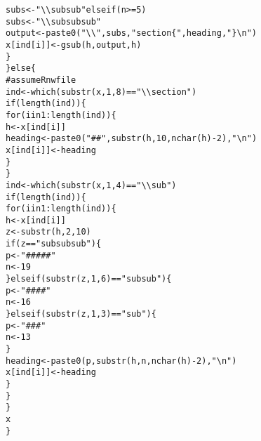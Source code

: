 \documentclass{article}\usepackage[]{graphicx}\usepackage[]{color}
\makeatletter
\newcommand{\hlnum}[1]{\textcolor[rgb]{0.863,0.196,0.184}{#1}}%
\newcommand{\hlstr}[1]{\textcolor[rgb]{0.863,0.196,0.184}{#1}}%
\newcommand{\hlcom}[1]{\textcolor[rgb]{0.345,0.431,0.459}{#1}}%
\newcommand{\hlopt}[1]{\textcolor[rgb]{0.576,0.631,0.631}{#1}}%
\newcommand{\hlstd}[1]{\textcolor[rgb]{0.514,0.58,0.588}{#1}}%
\newcommand{\hlkwa}[1]{\textcolor[rgb]{0.796,0.294,0.086}{#1}}%
\newcommand{\hlkwb}[1]{\textcolor[rgb]{0.522,0.6,0}{#1}}%
\newcommand{\hlkwd}[1]{\textcolor[rgb]{0.576,0.631,0.631}{#1}}%
\newenvironment{kframe}{%
 \def\at@end@of@kframe{}%
 \ifinner\ifhmode%
  \def\at@end@of@kframe{\end{minipage}}%
  \begin{minipage}{\columnwidth}%
 \fi\fi%
 \def\FrameCommand##1{\hskip\@totalleftmargin \hskip-\fboxsep
 \colorbox{shadecolor}{##1}\hskip-\fboxsep
     \hskip-\linewidth \hskip-\@totalleftmargin \hskip\columnwidth}%
 \MakeFramed {\advance\hsize-\width
   \@totalleftmargin\z@ \linewidth\hsize
   \@setminipage}}%
 {\par\unskip\endMakeFramed%
 \at@end@of@kframe}
\newenvironment{knitrout}{}{} %
\makeatother
\begin{document}
\begin{knitrout}
\begin{kframe}
\begin{alltt}
                \hlstd{subs} \hlkwb{<-} \hlstr{"\textbackslash{}\textbackslash{}subsub"} \hlkwa{else if} \hlstd{(n} \hlopt{>=} \hlnum{5}\hlstd{)}
                \hlstd{subs} \hlkwb{<-} \hlstr{"\textbackslash{}\textbackslash{}subsubsub"}
            \hlstd{output} \hlkwb{<-} \hlkwd{paste0}\hlstd{(}\hlstr{"\textbackslash{}\textbackslash{}"}\hlstd{, subs,} \hlstr{"section\{"}\hlstd{, heading,} \hlstr{"\}\textbackslash{}n"}\hlstd{)}
            \hlstd{x[ind[i]]} \hlkwb{<-} \hlkwd{gsub}\hlstd{(h, output, h)}
        \hlstd{\}}
    \hlstd{\}} \hlkwa{else} \hlstd{\{}
        \hlcom{# assume Rnw file}
        \hlstd{ind} \hlkwb{<-} \hlkwd{which}\hlstd{(}\hlkwd{substr}\hlstd{(x,} \hlnum{1}\hlstd{,} \hlnum{8}\hlstd{)} \hlopt{==} \hlstr{"\textbackslash{}\textbackslash{}section"}\hlstd{)}
        \hlkwa{if} \hlstd{(}\hlkwd{length}\hlstd{(ind)) \{}
            \hlkwa{for} \hlstd{(i} \hlkwa{in} \hlnum{1}\hlopt{:}\hlkwd{length}\hlstd{(ind)) \{}
                \hlstd{h} \hlkwb{<-} \hlstd{x[ind[i]]}
                \hlstd{heading} \hlkwb{<-} \hlkwd{paste0}\hlstd{(}\hlstr{"## "}\hlstd{,} \hlkwd{substr}\hlstd{(h,} \hlnum{10}\hlstd{,} \hlkwd{nchar}\hlstd{(h)} \hlopt{-} \hlnum{2}\hlstd{),} \hlstr{"\textbackslash{}n"}\hlstd{)}
                \hlstd{x[ind[i]]} \hlkwb{<-} \hlstd{heading}
            \hlstd{\}}
        \hlstd{\}}
        \hlstd{ind} \hlkwb{<-} \hlkwd{which}\hlstd{(}\hlkwd{substr}\hlstd{(x,} \hlnum{1}\hlstd{,} \hlnum{4}\hlstd{)} \hlopt{==} \hlstr{"\textbackslash{}\textbackslash{}sub"}\hlstd{)}
        \hlkwa{if} \hlstd{(}\hlkwd{length}\hlstd{(ind)) \{}
            \hlkwa{for} \hlstd{(i} \hlkwa{in} \hlnum{1}\hlopt{:}\hlkwd{length}\hlstd{(ind)) \{}
                \hlstd{h} \hlkwb{<-} \hlstd{x[ind[i]]}
                \hlstd{z} \hlkwb{<-} \hlkwd{substr}\hlstd{(h,} \hlnum{2}\hlstd{,} \hlnum{10}\hlstd{)}
                \hlkwa{if} \hlstd{(z} \hlopt{==} \hlstr{"subsubsub"}\hlstd{) \{}
                  \hlstd{p} \hlkwb{<-} \hlstr{"##### "}
                  \hlstd{n} \hlkwb{<-} \hlnum{19}
                \hlstd{\}} \hlkwa{else if} \hlstd{(}\hlkwd{substr}\hlstd{(z,} \hlnum{1}\hlstd{,} \hlnum{6}\hlstd{)} \hlopt{==} \hlstr{"subsub"}\hlstd{) \{}
                  \hlstd{p} \hlkwb{<-} \hlstr{"#### "}
                  \hlstd{n} \hlkwb{<-} \hlnum{16}
                \hlstd{\}} \hlkwa{else if} \hlstd{(}\hlkwd{substr}\hlstd{(z,} \hlnum{1}\hlstd{,} \hlnum{3}\hlstd{)} \hlopt{==} \hlstr{"sub"}\hlstd{) \{}
                  \hlstd{p} \hlkwb{<-} \hlstr{"### "}
                  \hlstd{n} \hlkwb{<-} \hlnum{13}
                \hlstd{\}}
                \hlstd{heading} \hlkwb{<-} \hlkwd{paste0}\hlstd{(p,} \hlkwd{substr}\hlstd{(h, n,} \hlkwd{nchar}\hlstd{(h)} \hlopt{-} \hlnum{2}\hlstd{),} \hlstr{"\textbackslash{}n"}\hlstd{)}
                \hlstd{x[ind[i]]} \hlkwb{<-} \hlstd{heading}
            \hlstd{\}}
        \hlstd{\}}
    \hlstd{\}}
    \hlstd{x}
\hlstd{\}}
\end{alltt}
\end{kframe}
\end{knitrout}
\end{document}

